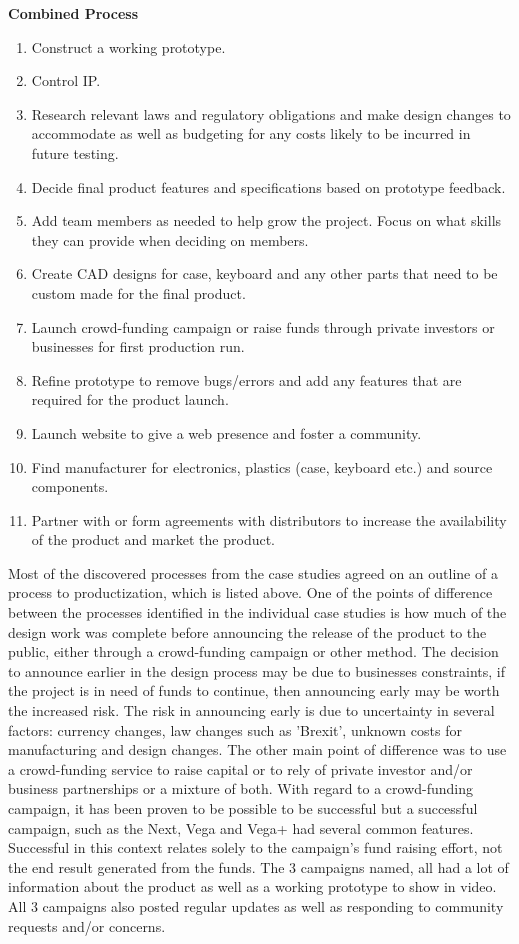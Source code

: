 \textbf{Combined Process}
\begin{enumerate}
\item Construct a working prototype.
\item Control IP.
\item Research relevant laws and regulatory obligations and make design changes to accommodate as well as budgeting for any costs likely to be incurred in future testing.
\item Decide final product features and specifications based on prototype feedback.
\item Add team members as needed to help grow the project. Focus on what skills they can provide when deciding on members.
\item Create CAD designs for case, keyboard and any other parts that need to be custom made for the final product.
\item Launch crowd-funding campaign or raise funds through private investors or businesses for first production run.
\item Refine prototype to remove bugs/errors and add any features that are required for the product launch.
\item Launch website to give a web presence and foster a community.
\item Find manufacturer for electronics, plastics (case, keyboard etc.) and source components.
\item Partner with or form agreements with distributors to increase the availability of the product and market the product.
\end{enumerate} 

Most of the discovered processes from the case studies agreed on an outline of a process to productization, which is listed above. One of the points of difference between the processes identified in the individual case studies is how much of the design work was complete before announcing the release of the product to the public, either through a crowd-funding campaign or other method. The decision to announce earlier in the design process may be due to businesses constraints, if the project is in need of funds to continue, then announcing early may be worth the increased risk. The risk in announcing early is due to uncertainty in several factors: currency changes, law changes such as 'Brexit', unknown costs for manufacturing and design changes. The other main point of difference was to use a crowd-funding service to raise capital or to rely of private investor and/or business partnerships or a mixture of both. With regard to a crowd-funding campaign, it has been proven to be possible to be successful but a successful campaign, such as the Next, Vega and Vega+ had several common features. Successful in this context relates solely to the campaign's fund raising effort, not the end result generated from the funds. The 3 campaigns named, all had a lot of information about the product as well as a working prototype to show in video. All 3 campaigns also posted regular updates as well as responding to community requests and/or concerns.

